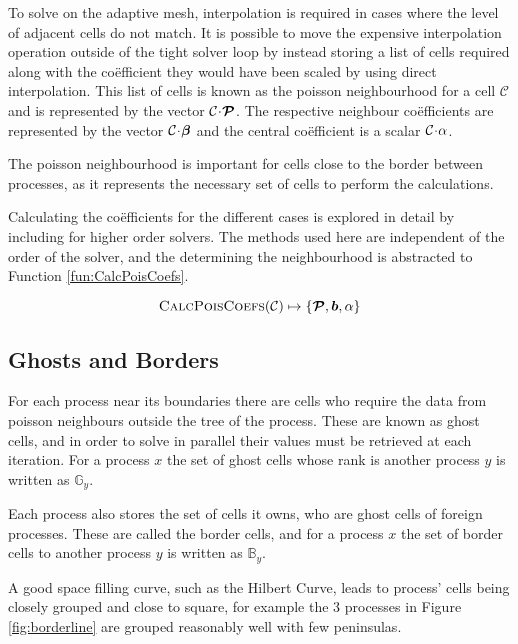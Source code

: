 \documentclass{IIBproject}
\newcommand{\vect} [1] {\bm{#1}}
\newcommand{\acc}{{\mkern 0.5mu\cdot\mkern 0.5mu}}
\numberwithin{figure}{section}
\begin{document}
To solve on the adaptive mesh, interpolation is required in cases where the level of adjacent cells do not match. It is possible to move the expensive interpolation operation outside of the tight solver loop by instead storing a list of cells required along with the co\"efficient they would have been scaled by using direct interpolation. This list of cells is known as the poisson neighbourhood for a cell $\mathcal{C}$ and is represented by the vector $\mathcal{C}\acc\vect{\mathcal{P}}$. The respective neighbour co\"efficients are represented by the vector $\mathcal{C}\acc\vect{\beta}$ and the central co\"efficient is a scalar $\mathcal{C}\acc\alpha$.

The poisson neighbourhood is important for cells close to the border between processes, as it represents the necessary set of cells to perform the calculations.

Calculating the co\"efficients for the different cases is explored in detail by \cite{Yung2010} including for higher order solvers. The methods used here are independent of the order of the solver, and the determining the neighbourhood is abstracted to Function \ref{fun:CalcPoisCoefs}.

\begin{equation}
    \label{fun:CalcPoisCoefs}
    \textproc{CalcPoisCoefs}(\mathcal{C}) \mapsto \{ \vect{\mathcal{P}}, \vect{b}, \alpha \}
\end{equation}

\subsection{Ghosts and Borders}
\label{sec:ghostsandborders}

For each process near its boundaries there are cells who require the data from poisson neighbours outside the tree of the process. These are known as ghost cells, and in order to solve in parallel their values must be retrieved at each iteration. For a process $x$ the set of ghost cells whose rank is another process $y$ is written as $\mathbb{G}_y$.

Each process also stores the set of cells it owns, who are ghost cells of foreign processes. These are called the border cells, and for a process $x$ the set of border cells to another process $y$ is written as $\mathbb{B}_y$.

A good space filling curve, such as the Hilbert Curve, leads to process' cells being closely grouped and close to square, for example the 3 processes in Figure \ref{fig:borderline} are grouped reasonably well with few peninsulas.
\end{document}
